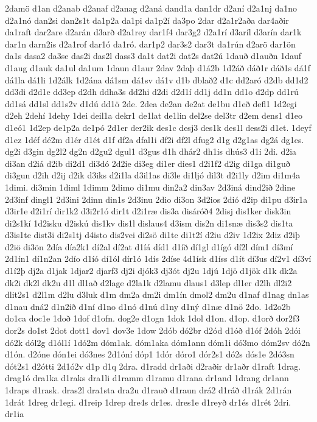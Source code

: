{2damö
d1an
d2anab
d2anaf
d2anag
d2aná
dand1a
dan1dr
d2aní
d2a1nj
da1no
d2a1nó
dan2si
dan2s1t
da1p2a
da1pi
da1p2í
da3po
2dar
d2a1r2aða
dar4aðir
da1raft
dar2are
d2arán
d3arð
d2a1rey
dar1f4
dar3g2
d2a1rí
d3aríl
d3arín
dar1k
dar1n
darn2is
d2a1rof
dar1ó
da1ró.
dar1p2
dar3s2
dar3t
da1rún
d2arö
dar1ön
da1s
dasa2
da3se
das2i
das2l
dass3
da1t
dat2i
dat2s
dat2ú
1dauð
d1auðn
1dauf
d1aug
d1auk
da1ul
da1um
1daun
d1aur
2dav
2daþ
d1á2b
1d2áð
dáð1r
dáð1s
dá1f
dá1la
dá1li
1d2álk
1d2ána
dá1sm
dá1sv
dá1v
d1b
dblað2
d1c
dd2aró
d2db
dd1d2
dd3di
d2d1e
dd3ep
d2dh
ddha3s
dd2hi
d2di
d2d1í
dd1j
dd1n
dd1o
d2dp
dd1rú
dd1sá
dd1sl
dd1s2v
d1dú
dd1ö
2de.
2dea
de2an
de2at
de1bu
d1eð
defl1
1d2egi
d2eh
2dehí
1dehy
1dei
deil1a
dekr1
de1lat
de1lin
del2se
del3tr
d2em
dens1
d1eo
d1eó1
1d2ep
de1p2a
de1pó
2d1er
der2ik
des1c
desj3
des1k
des1l
dess2i
d1et.
1deyf
d1ez
1déf
dé2m
d1ér
d1ét
d1f
df2a
dfal1i
df2i
df2l
dfug2
d1g
d2g1as
dg2á
dg1es.
dg2i
d3gin
dg2l2
dg2n
d2gu2
dgul1
d3gus
d1h
dhár2
dh1is
dhús3
d1i
2di.
d2ia
di3an
d2iá
d2ib
di2d1
di3dó
2d2ie
di3eg
di1er
dies1
d2i1f2
d2ig
di1ga
di1guð
di3gun
d2ih
d2ij
d2ik
d3iks
d2i1la
d3il1as
di3le
di1ljó
dil3t
d2i1ly
d2im
di1m4a
1dimi.
di3min
1diml
1dimm
2dimo
di1mu
din2a2
din3av
2d3iná
dind2ið
2dine
2d3inf
dingl1
2d3ini
2dinn
din1s
2d3inu
2dio
di3on
3d2ios
2dió
d2ip
di1pu
d3ir1a
d3ir1e
d2i1rí
dir1k2
d3i2r1ó
dir1t
d2i1ræ
dis3a
disáróð4
2disj
dis1ker
disk3in
di2s1kí
1d2isku
d2iskú
dis1kv
dis1l
dislaus4
d3ism
dis2n
di1snæ
dis3s2
dis1ta
d3is1te
dist3i
di2s1tj
d4isto
dis2vei
di2sö
di1te
di1t2í
d2iu
d2iv
1d2ix
2diz
d2iþ
d2iö
di3ön
2día
día2k1
dí2al
dí2at
d1íá
díd1
d1íð
dí1gl
d1ígó
dí2l
dím1
dí3mí
2d1ín1
dí1n2an
2dío
d1íó
dí1ól
dír1ó
1dís
2díse
4d1ísk
d1íss
d1ít
dí3us
dí2v1
dí3ví
d1í2þ
dj2a
d1jak
1djar2
djarf3
dj2i
djók3
dj3ót
dj2u
1djú
1djö
d1jök
d1k
dk2a
dk2i
dk2l
dk2u
d1l
dl1að
d2lage
d2la1k
d2lamu
dlaus1
d3lep
dl1er
d2lh
dl2i2
dlit2s1
d2l1m
d2lu
d3luk
d1m
dm2a
dm2i
dm1ín
dmol2
dm2u
d1naf
d1nag
dn1as
d1nau
dná2
d1n2ið
d1ní
d1no
d1nó
d1nú
d1ny
d1ný
d1næ
d1nö
2do.
1d2o2b
do1ca
doc1e
1doð
1dof
d1ofn.
dog2e
d1ogn
1dok
1dol
d1on.
d1op.
d1orð
dor2f3
dor2s
do1st
2dot
dott1
dov1
dov3e
1dow
2dób
dó2br
d2ód
d1óð
d1óf
2dóh
2dói
dó2k
dól2g
d1ól1í
1dó2m
dóm1ak.
dóm1aka
dóm1ann
dóm1i
dó3mo
dóm2sv
dó2n
d1ón.
d2óne
dón1ei
dó3nes
2d1óní
dóp1
1dór
dóro1
dór2s1
dó2s
dós1e
2dó3sn
dót2s1
d2ótti
2d1ó2v
d1p
d1q
2dra.
d1radd
dr1aði
d2raðir
dr1aðr
d1raft
1drag.
drag1ó
dra1ka
d1raks
dra1li
d1ramm
d1ramu
d1rana
dr1and
1drang
dr1ann
1draps
d1rask.
dras2l
dra1sta
dra2u
d1rauð
d1raun
drá2
d1ráð
d1rák
2d1rán
1drát
1dreg
dr1egi.
d1reip
1drep
dre4s
dr1es.
dres1e
d1reyð
dr1és
d1rét
2dri.
dr1ia
}

